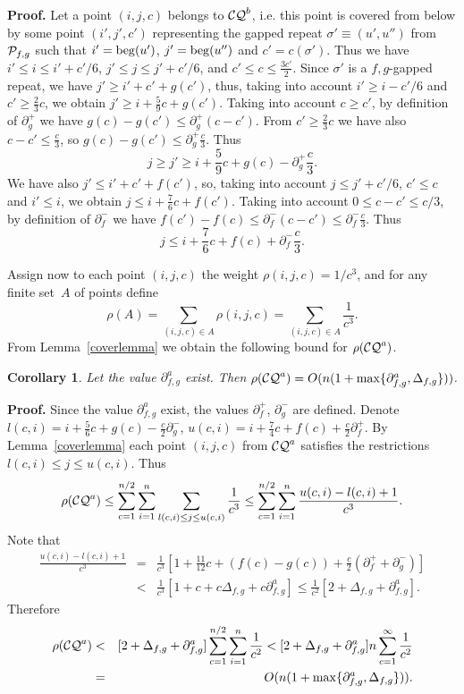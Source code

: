 \documentclass{article}
\newtheorem{corollary}{Corollary}
\begin{document}
{\bf Proof.} Let a point $(i, j, c)$ belongs to ${\cal CQ}^b$, i.e. this point
is covered from below by some point $(i', j', c')$ representing the gapped repeat
$\sigma'\equiv (u', u'')$ from ${\cal P}_{f, g}$ such that $i'={\rm beg} (u')$, 
$j'={\rm beg} (u'')$ and $c'=c(\sigma')$. Thus we have $i'\le i \le i'+c'/6$,
$j'\le j \le j'+c'/6$, and $c'\le c \le \frac{3c'}{2}$. Since $\sigma'$ is a 
$f,g$-gapped repeat, we have $j'\ge i'+c'+g(c')$, thus, taking into account 
$i'\ge i-c'/6$ and $c'\ge\frac{2}{3} c$, we obtain $j'\ge i+\frac{5}{9}c+g(c')$.
Taking into account $c\ge c'$, by definition of $\partial^+_g$ we have 
$g(c)-g(c')\le\partial^+_g (c-c')$. From $c'\ge\frac{2}{3} c$ we have also
$c-c'\le\frac{c}{3}$, so $g(c)-g(c')\le\partial^+_g\frac{c}{3}$. Thus
$$
j\ge j'\ge i+\frac{5}{9}c+g(c)-\partial^+_g\frac{c}{3}.
$$
We have also $j'\le i'+c'+f(c')$, so, taking into account $j \le j'+c'/6$, $c'\le c$
and $i'\le i$, we obtain $j\le i+\frac{7}{6}c+f(c')$. Taking into account 
$0\le c-c'\le c/3$, by definition of $\partial^-_f$ we have $f(c')-f(c)\le
\partial^-_f (c-c')\le\partial^-_f\frac{c}{3}$. Thus
$$
j\le i+\frac{7}{6}c+f(c)+ \partial^-_f\frac{c}{3}.
$$

Assign now to each point $(i, j, c)$ the weight $\rho (i, j, c)=1/c^3$,
and for any finite set~$A$ of points define 
$$
\rho (A)=\sum_{(i, j, c)\in A} \rho (i, j, c)=\sum_{(i, j, c)\in A}\frac{1}{c^3}.
$$
From Lemma~\ref{coverlemma} we obtain the following bound for $\rho ({\cal CQ}^a)$.

\begin{corollary}
Let the value $\partial^a_{f, g}$ exist. Then 
$\rho ({\cal CQ}^a)=O(n(1+\max\{\partial^a_{f, g}, \Delta_{f, g}\}))$.
\label{weightcorra}
\end{corollary}

{\bf Proof.} Since the value $\partial^a_{f, g}$ exist, 
the values $\partial^+_f$, $\partial^-_g$ are defined.
Denote $l(c, i)=i+\frac{5}{6}c+g(c)-\frac{c}{2}\partial^-_g$,
$u(c, i)=i+\frac{7}{4}c+f(c)+\frac{c}{2}\partial^+_f$. By Lemma~\ref{coverlemma}
each point $(i, j, c)$ from ${\cal CQ}^a$ satisfies the restrictions 
$l(c, i)\le j\le u(c, i)$. Thus
$$
\rho ({\cal CQ}^a)\le \sum_{c=1}^{n/2}\sum_{i=1}^{n}\sum_{l(c, i)\le j\le u(c, i)}\frac{1}{c^3}
\le \sum_{c=1}^{n/2}\sum_{i=1}^{n}\frac{u(c, i)-l(c, i)+1}{c^3}.
$$
Note that
\begin{eqnarray*}
\frac{u(c, i)-l(c, i)+1}{c^3}&=&\frac{1}{c^3}[1+\frac{11}{12}c+(f(c)-g(c))+
\frac{c}{2}(\partial^+_f+\partial^-_g)]\\
&<&\frac{1}{c^3}[1+c+c\Delta_{f, g}+c\partial^a_{f, g}]\le\frac{1}{c^2}[2+\Delta_{f, g}+\partial^a_{f, g}].
\end{eqnarray*}
Therefore
\begin{eqnarray*}
\rho ({\cal CQ}^a)&<&[2+\Delta_{f, g}+\partial^a_{f, g}]\sum_{c=1}^{n/2}\sum_{i=1}^{n}\frac{1}{c^2}<
[2+\Delta_{f, g}+\partial^a_{f, g}]n\sum_{c=1}^{\infty}\frac{1}{c^2}\\
&=&O(n(1+\max\{\partial^a_{f, g}, \Delta_{f, g}\})).
\end{eqnarray*}
\end{document}

